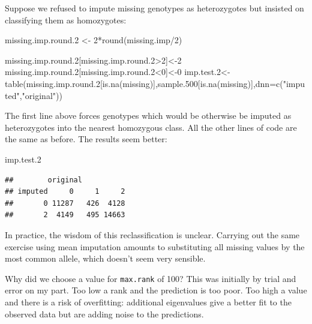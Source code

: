 \documentclass[
]{book}
\newenvironment{Shaded}{\begin{snugshade}}{\end{snugshade}}
\newcommand{\AttributeTok}[1]{\textcolor[rgb]{0.77,0.63,0.00}{#1}}
\newcommand{\DecValTok}[1]{\textcolor[rgb]{0.00,0.00,0.81}{#1}}
\newcommand{\FloatTok}[1]{\textcolor[rgb]{0.00,0.00,0.81}{#1}}
\newcommand{\FunctionTok}[1]{\textcolor[rgb]{0.00,0.00,0.00}{#1}}
\newcommand{\NormalTok}[1]{#1}
\newcommand{\OtherTok}[1]{\textcolor[rgb]{0.56,0.35,0.01}{#1}}
\newcommand{\SpecialCharTok}[1]{\textcolor[rgb]{0.00,0.00,0.00}{#1}}
\newcommand{\StringTok}[1]{\textcolor[rgb]{0.31,0.60,0.02}{#1}}
\begin{document}
Suppose we refused to impute missing genotypes as heterozygotes but insisted on classifying them as homozygotes:

\begin{Shaded}
\begin{Highlighting}[]
\NormalTok{missing.imp.round}\FloatTok{.2} \OtherTok{\textless{}{-}} \DecValTok{2}\SpecialCharTok{*}\FunctionTok{round}\NormalTok{(missing.imp}\SpecialCharTok{/}\DecValTok{2}\NormalTok{)}

\NormalTok{missing.imp.round}\FloatTok{.2}\NormalTok{[missing.imp.round}\FloatTok{.2}\SpecialCharTok{\textgreater{}}\DecValTok{2}\NormalTok{]}\OtherTok{\textless{}{-}}\DecValTok{2}
\NormalTok{missing.imp.round}\FloatTok{.2}\NormalTok{[missing.imp.round}\FloatTok{.2}\SpecialCharTok{\textless{}}\DecValTok{0}\NormalTok{]}\OtherTok{\textless{}{-}}\DecValTok{0}
\NormalTok{imp.test}\FloatTok{.2}\OtherTok{\textless{}{-}}\FunctionTok{table}\NormalTok{(missing.imp.round}\FloatTok{.2}\NormalTok{[}\FunctionTok{is.na}\NormalTok{(missing)],sample}\FloatTok{.500}\NormalTok{[}\FunctionTok{is.na}\NormalTok{(missing)],}\AttributeTok{dnn=}\FunctionTok{c}\NormalTok{(}\StringTok{"imputed"}\NormalTok{,}\StringTok{"original"}\NormalTok{))}
\end{Highlighting}
\end{Shaded}

The first line above forces genotypes which would be otherwise be imputed as heterozygotes into the nearest homozygous class. All the other lines of code are the same as before. The results seem better:

\begin{Shaded}
\begin{Highlighting}[]
\NormalTok{imp.test}\FloatTok{.2}
\end{Highlighting}
\end{Shaded}

\begin{verbatim}
##        original
## imputed     0     1     2
##       0 11287   426  4128
##       2  4149   495 14663
\end{verbatim}

In practice, the wisdom of this reclassification is unclear. Carrying out the same exercise using mean imputation amounts to substituting all missing values by the most common allele, which doesn't seem very sensible.

Why did we choose a value for \texttt{max.rank} of 100? This was initially by trial and error on my part. Too low a rank and the prediction is too poor. Too high a value and there is a risk of overfitting: additional eigenvalues give a better fit to the observed data but are adding noise to the predictions.
\end{document}
